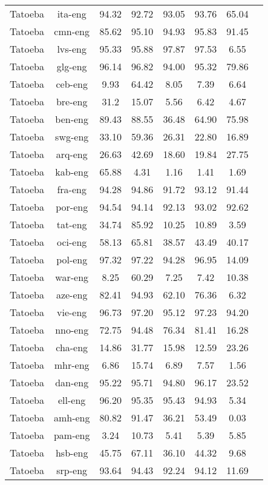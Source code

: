 \documentclass[11pt]{article}
\begin{document}
\begin{table*}[t!]
{\begin{tabular}{lc|cccccc}
Tatoeba & ita-eng & 94.32 & 92.72 & 93.05 & 93.76 & 65.04 \\
Tatoeba & cmn-eng & 85.62 & 95.10 & 94.93 & 95.83 & 91.45 \\
Tatoeba & lvs-eng & 95.33 & 95.88 & 97.87 & 97.53 & 6.55 \\
Tatoeba & glg-eng & 96.14 & 96.82 & 94.00 & 95.32 & 79.86 \\
Tatoeba & ceb-eng & 9.93 & 64.42 & 8.05 & 7.39 & 6.64 \\
Tatoeba & bre-eng & 31.2 & 15.07 & 5.56 & 6.42 & 4.67 \\
Tatoeba & ben-eng & 89.43 & 88.55 & 36.48 & 64.90 & 75.98 \\
Tatoeba & swg-eng & 33.10 & 59.36 & 26.31 & 22.80 & 16.89 \\
Tatoeba & arq-eng & 26.63 & 42.69 & 18.60 & 19.84 & 27.75 \\
Tatoeba & kab-eng & 65.88 & 4.31 & 1.16 & 1.41 & 1.69 \\
Tatoeba & fra-eng & 94.28 & 94.86 & 91.72 & 93.12 & 91.44 \\
Tatoeba & por-eng & 94.54 & 94.14 & 92.13 & 93.02 & 92.62 \\
Tatoeba & tat-eng & 34.74 & 85.92 & 10.25 & 10.89 & 3.59 \\
Tatoeba & oci-eng & 58.13 & 65.81 & 38.57 & 43.49 & 40.17 \\
Tatoeba & pol-eng & 97.32 & 97.22 & 94.28 & 96.95 & 14.09 \\
Tatoeba & war-eng & 8.25 & 60.29 & 7.25 & 7.42 & 10.38 \\
Tatoeba & aze-eng & 82.41 & 94.93 & 62.10 & 76.36 & 6.32 \\
Tatoeba & vie-eng & 96.73 & 97.20 & 95.12 & 97.23 & 94.20 \\
Tatoeba & nno-eng & 72.75 & 94.48 & 76.34 & 81.41 & 16.28 \\
Tatoeba & cha-eng & 14.86 & 31.77 & 15.98 & 12.59 & 23.26 \\
Tatoeba & mhr-eng & 6.86 & 15.74 & 6.89 & 7.57 & 1.56 \\
Tatoeba & dan-eng & 95.22 & 95.71 & 94.80 & 96.17 & 23.52 \\
Tatoeba & ell-eng & 96.20 & 95.35 & 95.43 & 94.93 & 5.34 \\
Tatoeba & amh-eng & 80.82 & 91.47 & 36.21 & 53.49 & 0.03 \\
Tatoeba & pam-eng & 3.24 & 10.73 & 5.41 & 5.39 & 5.85 \\
Tatoeba & hsb-eng & 45.75 & 67.11 & 36.10 & 44.32 & 9.68 \\
Tatoeba & srp-eng & 93.64 & 94.43 & 92.24 & 94.12 & 11.69 \\

\end{tabular}}
\end{table*}
\end{document}
